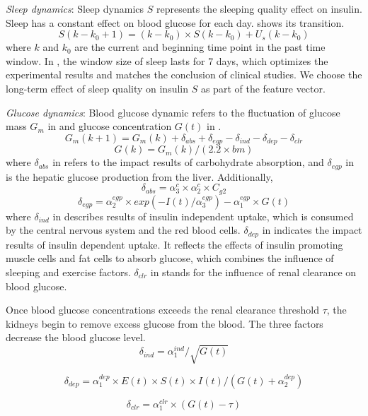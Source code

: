 {\textit{Sleep dynamics}:
Sleep dynamics $S$ represents the sleeping quality effect on insulin.
Sleep has a constant effect on blood glucose for each day.
 shows its transition.
\begin{equation}\label{Eq:S}
S(k-k_0+1)=(k-k_0) \times S(k-k_0)+U_{s}(k-k_0)
\end{equation}
where $k$ and $k_0$ are the current and beginning time point in the past time window.
In \sysname, the window size of sleep lasts for 7 days, which optimizes the experimental results and matches the conclusion of clinical studies.
We choose the long-term effect of sleep quality on insulin $S$ as part of the feature vector.

\textit{Glucose dynamics}:
Blood glucose dynamic refers to the fluctuation of glucose mass $G_m$ in  and glucose concentration $G(t)$ in .
\begin{equation}\label{Eq:Gm}
G_m(k+1)=G_m(k)+\delta_{abs}+\delta_{egp}-\delta_{ind}-\delta_{dep}-\delta_{clr}
\end{equation}
\begin{equation}\label{Eq:G}
G(k)=G_m(k)/(2.2 \times bm)
\end{equation}
where $\delta_{abs}$ in  refers to the impact results of carbohydrate absorption, and $\delta_{egp}$ in  is the hepatic glucose production from the liver.
Additionally,
\begin{equation}\label{Eq:abs}
  \delta_{abs}=\alpha_3^c \times \alpha_2^c \times C_{g2}
\end{equation}
\begin{equation}\label{Eq:egp}
  \delta_{egp}=\alpha_2^{egp} \times exp(-I(t)/\alpha_3^{egp})-\alpha_1^{egp} \times G(t)
\end{equation}
where $\delta_{ind}$ in  describes results of insulin independent uptake, which is consumed by the central nervous system and the red blood cells.
$\delta_{dep}$ in  indicates the impact results of insulin dependent uptake.
It reflects the effects of insulin promoting muscle cells and fat cells to absorb glucose, which combines the influence of sleeping and exercise factors.
$\delta_{clr}$ in  stands for the influence of renal clearance on blood glucose.

Once blood glucose concentrations exceeds the renal clearance threshold $\tau$, the kidneys begin to remove excess glucose from the blood.
The three factors decrease the blood glucose level.
\begin{equation}\label{Eq:ind}
  \delta_{ind}=\alpha_1^{ind}/\sqrt{G(t)}
\end{equation}

\begin{equation}\label{Eq:dep}
  \delta_{dep}=\alpha_1^{dep} \times  E(t) \times S(t) \times I(t)/(G(t)+\alpha_2^{dep})
\end{equation}

\begin{equation}\label{Eq:clr}
  \delta_{clr}=\alpha_1^{clr} \times (G(t)-\tau)
\end{equation}
}

